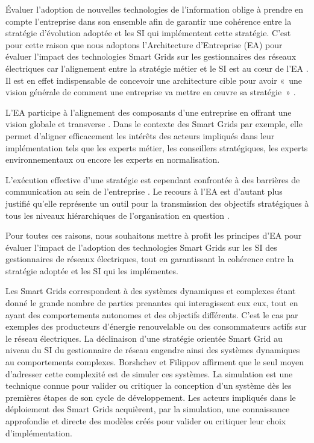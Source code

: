 Évaluer l'adoption de nouvelles technologies de l'information oblige à prendre 
en compte l'entreprise dans son ensemble afin de garantir une cohérence entre la 
stratégie d'évolution adoptée et les SI qui implémentent cette stratégie. C'est 
pour cette raison que nous adoptons l'Architecture d'Entreprise (EA) pour 
évaluer l'impact des technologies Smart Grids sur les gestionnaires des réseaux 
électriques car l'alignement entre la stratégie métier et le SI est au cœur de 
l'EA \cite{zachman1997enterprise}. Il est en effet indispensable de concevoir 
une architecture cible pour avoir  «~une vision générale de comment une 
entreprise va mettre en œuvre sa stratégie~» \cite{ross2006enterprise}.

L'EA participe à l'alignement des composants d'une entreprise en offrant une 
vision globale et transverse \cite{zachman1987framework}. Dans le contexte des 
Smart Grids par exemple, elle permet d'aligner efficacement les intérêts des 
acteurs impliqués dans leur implémentation tels que les experts métier, les 
conseillers stratégiques, les experts environnementaux ou encore les experts en 
normalisation.

L'exécution effective d'une stratégie est cependant confrontée à des barrières 
de communication au sein de l'entreprise \cite{vcater2010factors}. Le recours à 
l'EA est d'autant plus justifié qu'elle représente un outil pour la transmission 
des objectifs stratégiques à tous les niveaux hiérarchiques de l'organisation en 
question \cite{kappelman2008enterprise}. 

Pour toutes ces raisons, nous souhaitons mettre à profit les principes d'EA pour 
évaluer l'impact de l'adoption des technologies Smart Grids sur les SI des 
gestionnaires de réseaux électriques, tout en garantissant la cohérence entre la 
stratégie adoptée et les SI qui les implémentes. 




Les Smart Grids correspondent à des systèmes  dynamiques et complexes 
\cite{monti_power_2010} étant donné le grande nombre de parties prenantes qui 
interagissent eux eux, tout en ayant des comportements autonomes et des 
objectifs différents. C'est le cas par exemples des producteurs d'énergie 
renouvelable ou des consommateurs actifs sur le réseau électriques. La 
déclinaison d'une stratégie orientée Smart Grid au niveau du 
SI du gestionnaire de réseau engendre ainsi des systèmes dynamiques au 
comportements complexes. Borshchev et Filippov\cite{borshchev2004system} 
affirment que le seul moyen d'adresser cette complexité est de simuler ces 
systèmes. La simulation est une technique connue pour valider ou critiquer la 
conception d'un système dès les premières étapes de son cycle de développement. 
Les acteurs impliqués dans le déploiement des 
Smart Grids acquièrent, par la  simulation, une connaissance approfondie et 
directe des modèles créés pour valider ou critiquer leur choix d'implémentation.

